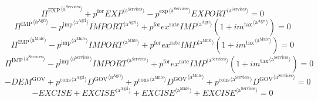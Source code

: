 \begin{equation}
{\Pi^{\mathrm{EXP}}}^{\langle \mathrm{a}^{\mathrm{Services}}\rangle} + {p^{\mathrm{for}}} {{{E\!X\!P}}^{\langle \mathrm{a}^{\mathrm{Services}}\rangle}} - {{p^{\mathrm{exp}}}^{\langle \mathrm{a}^{\mathrm{Services}}\rangle}} {{{E\!X\!P\!O\!R\!T}}^{\langle \mathrm{a}^{\mathrm{Services}}\rangle}} = 0
\end{equation}
\begin{equation}
{\Pi^{\mathrm{IMP}}}^{\langle \mathrm{a}^{\mathrm{Agri}}\rangle} - {{p^{\mathrm{imp}}}^{\langle \mathrm{a}^{\mathrm{Agri}}\rangle}} {{{I\!M\!P\!O\!R\!T}}^{\langle \mathrm{a}^{\mathrm{Agri}}\rangle}} + {p^{\mathrm{for}}} {{e\!x}^{\mathrm{rate}}} {{{I\!M\!P}}^{\langle \mathrm{a}^{\mathrm{Agri}}\rangle}} \left(1 + {{i\!m}^{\mathrm{tax}}}^{\langle \mathrm{\mathrm{a}^{\mathrm{Agri}}}\rangle}\right) = 0
\end{equation}
\begin{equation}
{\Pi^{\mathrm{IMP}}}^{\langle \mathrm{a}^{\mathrm{Mnfc}}\rangle} - {{p^{\mathrm{imp}}}^{\langle \mathrm{a}^{\mathrm{Mnfc}}\rangle}} {{{I\!M\!P\!O\!R\!T}}^{\langle \mathrm{a}^{\mathrm{Mnfc}}\rangle}} + {p^{\mathrm{for}}} {{e\!x}^{\mathrm{rate}}} {{{I\!M\!P}}^{\langle \mathrm{a}^{\mathrm{Mnfc}}\rangle}} \left(1 + {{i\!m}^{\mathrm{tax}}}^{\langle \mathrm{\mathrm{a}^{\mathrm{Mnfc}}}\rangle}\right) = 0
\end{equation}
\begin{equation}
{\Pi^{\mathrm{IMP}}}^{\langle \mathrm{a}^{\mathrm{Services}}\rangle} - {{p^{\mathrm{imp}}}^{\langle \mathrm{a}^{\mathrm{Services}}\rangle}} {{{I\!M\!P\!O\!R\!T}}^{\langle \mathrm{a}^{\mathrm{Services}}\rangle}} + {p^{\mathrm{for}}} {{e\!x}^{\mathrm{rate}}} {{{I\!M\!P}}^{\langle \mathrm{a}^{\mathrm{Services}}\rangle}} \left(1 + {{i\!m}^{\mathrm{tax}}}^{\langle \mathrm{\mathrm{a}^{\mathrm{Services}}}\rangle}\right) = 0
\end{equation}
\begin{equation}
-{D\!E\!M}^{\mathrm{GOV}} + {{p^{\mathrm{cons}}}^{\langle \mathrm{a}^{\mathrm{Agri}}\rangle}} {{D^{\mathrm{GOV}}}^{\langle \mathrm{a}^{\mathrm{Agri}}\rangle}} + {{p^{\mathrm{cons}}}^{\langle \mathrm{a}^{\mathrm{Mnfc}}\rangle}} {{D^{\mathrm{GOV}}}^{\langle \mathrm{a}^{\mathrm{Mnfc}}\rangle}} + {{p^{\mathrm{cons}}}^{\langle \mathrm{a}^{\mathrm{Services}}\rangle}} {{D^{\mathrm{GOV}}}^{\langle \mathrm{a}^{\mathrm{Services}}\rangle}} = 0
\end{equation}
\begin{equation}
-{E\!X\!C\!I\!S\!E} + {{E\!X\!C\!I\!S\!E}}^{\langle \mathrm{a}^{\mathrm{Agri}}\rangle} + {{E\!X\!C\!I\!S\!E}}^{\langle \mathrm{a}^{\mathrm{Mnfc}}\rangle} + {{E\!X\!C\!I\!S\!E}}^{\langle \mathrm{a}^{\mathrm{Services}}\rangle} = 0
\end{equation}

